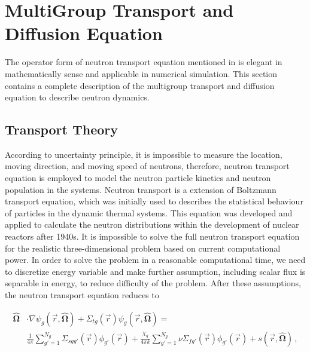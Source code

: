
\cleardoublepage

\chapter{MultiGroup Transport and Diffusion Equation}
\label{chapter:multigroup}
The operator form of neutron transport equation mentioned in  is elegant in mathematically sense and applicable in numerical simulation.
This section contains a complete description of the multigroup transport and diffusion equation to describe neutron dynamics.

\section{Transport Theory}

According to uncertainty principle, it is impossible to measure the location, moving direction, and moving speed of neutrons, therefore, neutron transport equation is employed to model the neutron particle kinetics and neutron population in the systems.
Neutron transport is a extension of Boltzmann transport equation, which was initially used to describes the statistical behaviour of particles in the dynamic thermal systems.
This equation was developed and applied to calculate the neutron distributions within the development of nuclear reactors after 1940s.
It is impossible to solve the full neutron transport equation for the realistic three-dimensional problem based on current computational power.
In order to solve the problem in a reasonable computational time, we need to discretize energy variable and make further assumption, including scalar flux is separable in energy, to reduce difficulty of the problem.
After these assumptions, the neutron transport equation reduces to

\begin{equation}
\begin{split}
  \bm{\hat{\Omega}} & \cdot \nabla \psi_g(\vec{r},\bm{\hat{\Omega}}) +
    \Sigma_{t g}(\vec{r}) \psi_{g}(\vec{r},\bm{\hat{\Omega}}) = \\
   & \frac{1}{4\pi} \sum\limits^{N_g}_{g'=1} \Sigma_{s g g'}(\vec{r}) \phi_{g'}(\vec{r}) +
    \frac{\chi_g}{4\pi k} \sum\limits^{N_g}_{g'=1} \nu\Sigma_{fg'}(\vec{r}) \phi_{g'}(\vec{r}) 
    + s(\vec{r},\bm{\hat{\Omega}})\, ,
\end{split}
\label{eq:transport}
\end{equation}

